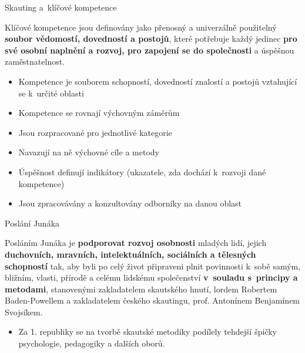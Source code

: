 \documentclass[compress,xelatex,xcolor=dvipsnames,hyperref={pdfpagelabels=false},print]{beamer}
\begin{document}
\begin{frame}{Skauting a~klíčové kompetence}
\begin{center}
Klíčové kompetence jsou definovány jako přenosný a univerzálně použitelný \textbf{soubor vědomostí, dovedností a postojů}, které potřebuje každý jedinec \textbf{pro své osobní naplnění a rozvoj, pro zapojení se do společnosti} a úspěšnou zaměstnatelnost.
\end{center}
\begin{itemize}
\item Kompetence je souborem schopností, dovedností znalostí a postojů vztahující se k~určité oblasti
\item Kompetence se rovnají výchovným záměrům
\item Jsou rozpracované pro jednotlivé kategorie
\item Navazují na ně výchovné cíle a metody
\item Úspěšnost definují indikátory (ukazatele, zda dochází k~rozvoji dané kompetence)
\item Jsou zpracovávány a konzultovány odborníky na danou oblast
\end{itemize}
\end{frame}

\begin{frame}{Poslání Junáka}
\begin{center}
\begin{Large}
Posláním Junáka je \textbf{podporovat rozvoj osobnosti} mladých lidí, jejich \textbf{duchovních, mravních, intelektuálních, sociálních a tělesných schopností} tak, aby byli po celý život připraveni plnit povinnosti k~sobě samým, bližním, vlasti, přírodě a celému lidskému společenství \textbf{v~souladu s~principy a metodami}, stanovenými zakladatelem skautského hnutí, lordem Robertem Baden-Powellem a zakladatelem českého skautingu, prof. Antonínem Benjamínem Svojsíkem.
\end{Large}
\end{center}
\begin{itemize}
\item Za 1. republiky se na tvorbě skautské metodiky podílely tehdejší špičky psychologie, pedagogiky a dalších oborů.
\end{itemize}
\end{frame}
\end{document}
